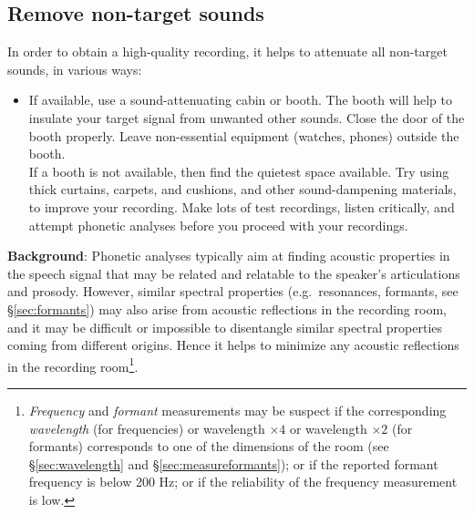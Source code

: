 \documentclass[
]{book}
\providecommand{\tightlist}{%
  \setlength{\itemsep}{0pt}\setlength{\parskip}{0pt}}
\begin{document}
\label{recording}
\subsection{Remove non-target sounds}\label{sec:removenontargetsounds}

In order to obtain a high-quality recording, it helps to attenuate all non-target sounds, in various ways:

\begin{itemize}
\tightlist
\item
  If available, use a sound-attenuating cabin or booth. The booth will help to insulate your target signal from unwanted other sounds. Close the door of the booth properly. Leave non-essential equipment (watches, phones) outside the booth.\\
  If a booth is not available, then find the quietest space available. Try using thick curtains, carpets, and cushions, and other sound-dampening materials, to improve your recording. Make lots of test recordings, listen critically, and attempt phonetic analyses before you proceed with your recordings.
\end{itemize}

\textbf{Background}: Phonetic analyses typically aim at finding acoustic properties in the speech signal that may be related and relatable to the speaker's articulations and prosody. However, similar spectral properties (e.g.~resonances, formants, see §\ref{sec:formants}) may also arise from acoustic reflections in the recording room, and it may be difficult or impossible to disentangle similar spectral properties coming from different origins. Hence it helps to minimize any acoustic reflections in the recording room\footnote{\emph{Frequency} and \emph{formant} measurements may be suspect if the corresponding \emph{wavelength} (for frequencies) or wavelength \(\times 4\) or wavelength \(\times 2\) (for formants) corresponds to one of the dimensions of the room (see §\ref{sec:wavelength} and §\ref{sec:measureformants}); or if the reported formant frequency is below 200 Hz; or if the reliability of the frequency measurement is low.}.
\end{document}
